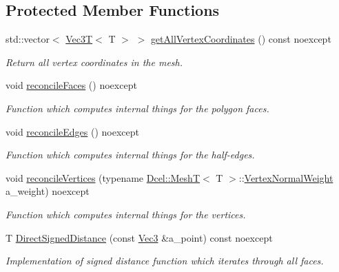 \subsection*{Protected Member Functions}
\begin{DoxyCompactItemize}
\item 
\mbox{\label{classDcel_1_1MeshT_a597a38ed9f3e3a2a33f2d1211da322f3}} 
std\+::vector$<$ \hyperlink{classVec3T}{Vec3T}$<$ T $>$ $>$ \hyperlink{classDcel_1_1MeshT_a597a38ed9f3e3a2a33f2d1211da322f3}{get\+All\+Vertex\+Coordinates} () const noexcept
\begin{DoxyCompactList}\small\item\em Return all vertex coordinates in the mesh. \end{DoxyCompactList}\item 
void \hyperlink{classDcel_1_1MeshT_a5e31ae8b95c9ee725e205d8ae4fd35dc}{reconcile\+Faces} () noexcept
\begin{DoxyCompactList}\small\item\em Function which computes internal things for the polygon faces. \end{DoxyCompactList}\item 
void \hyperlink{classDcel_1_1MeshT_a33f6506c1daf9946d1f21117c0ab89d5}{reconcile\+Edges} () noexcept
\begin{DoxyCompactList}\small\item\em Function which computes internal things for the half-\/edges. \end{DoxyCompactList}\item 
void \hyperlink{classDcel_1_1MeshT_ad2b65aa214d51ecd438bc876e7255290}{reconcile\+Vertices} (typename \hyperlink{classDcel_1_1MeshT}{Dcel\+::\+MeshT}$<$ T $>$\+::\hyperlink{classDcel_1_1MeshT_a0cd3a02853cf4fcc34a0816368ed4dc0}{Vertex\+Normal\+Weight} a\+\_\+weight) noexcept
\begin{DoxyCompactList}\small\item\em Function which computes internal things for the vertices. \end{DoxyCompactList}\item 
T \hyperlink{classDcel_1_1MeshT_ada074ff3b1a612e46098f4ba6ca0bda2}{Direct\+Signed\+Distance} (const \hyperlink{classDcel_1_1MeshT_a646c5d8f66b3079bca35fe4186493627}{Vec3} \&a\+\_\+point) const noexcept
\begin{DoxyCompactList}\small\item\em Implementation of signed distance function which iterates through all faces. \end{DoxyCompactList}\item 

\end{DoxyCompactItemize}
